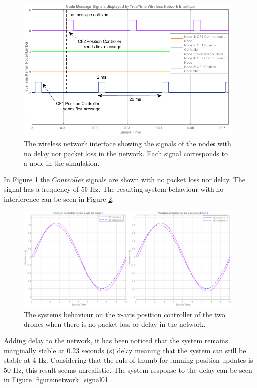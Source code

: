 \begin{figure}[H]
\centering
 \includegraphics[scale=0.5]{Figures/network_inter0.png}
 \caption{The wireless network interface showing the signals of the nodes with no delay nor packet loss in the network. Each signal corresponds to a node in the simulation.}
 \label{figure:network_signal0}
\end{figure}

In Figure \ref{figure:network_signal0} the $Controller$ signals are shown with no packet loss nor delay. The signal has a frequency of 50 Hz. The resulting system behaviour with no interference can be seen in Figure \ref{figure:noloss}.

\begin{figure}[H]
\centering
 \includegraphics[scale=0.4]{Figures/2drones_noloss.png}
 \caption{The systems behaviour on the x-axis position controller of the two drones when there is no packet loss or delay in the network.}
 \label{figure:noloss}
\end{figure}

Adding delay to the network, it has been noticed that the system remains marginally stable at 0.23 seconds (s) delay meaning that the system can still be stable at 4 Hz. Considering that the rule of thumb for running position updates is 50 Hz, this result seems unrealistic. The system response to the delay can be seen in Figure \ref{figure:network_signal01}.

